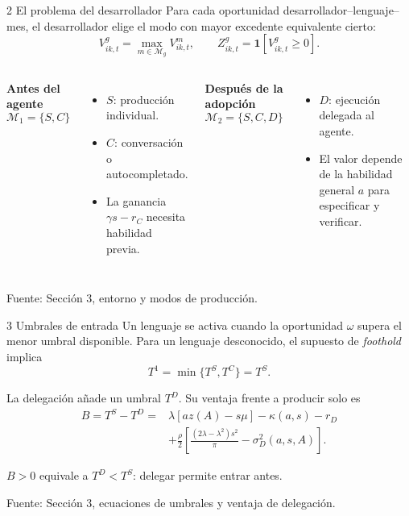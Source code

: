 \documentclass[aspectratio=169,11pt]{beamer}
\newcommand{\sourcefoot}[1]{\vfill{\scriptsize\color{black!60}Fuente: #1}}
\begin{document}
\begin{frame}{2 \textperiodcentered{} El problema del desarrollador}
  Para cada oportunidad desarrollador--lenguaje--mes, el desarrollador elige
  el modo con mayor excedente equivalente cierto:
  \[
    V^g_{ik,t}=\max_{m\in\mathcal M_g}V^m_{ik,t},
    \qquad
    Z^g_{ik,t}=\mathbf 1\!\left[V^g_{ik,t}\ge 0\right].
  \]

  \begin{columns}[T,onlytextwidth]
    \textbf{Antes del agente}
    \[
      \mathcal M_1=\{S,C\}
    \]
    \begin{itemize}\small
      \item $S$: producción individual.
      \item $C$: conversación o autocompletado.
      \item La ganancia $\gamma s-r_C$ necesita habilidad previa.
    \end{itemize}

    \textbf{Después de la adopción}
    \[
      \mathcal M_2=\{S,C,D\}
    \]
    \begin{itemize}\small
      \item $D$: ejecución delegada al agente.
      \item El valor depende de la habilidad general $a$ para especificar y verificar.
    \end{itemize}
  \end{columns}

  \sourcefoot{Sección 3, entorno y modos de producción.}
\end{frame}

\begin{frame}{3 \textperiodcentered{} Umbrales de entrada}
  Un lenguaje se activa cuando la oportunidad $\omega$ supera el menor umbral
  disponible. Para un lenguaje desconocido, el supuesto de \emph{foothold}
  implica
  \[
    T^1=\min\{T^S,T^C\}=T^S.
  \]

  La delegación añade un umbral $T^D$. Su ventaja frente a producir solo es
  \begin{align*}
    B=T^S-T^D
    ={}&\lambda[az(A)-s\mu]-\kappa(a,s)-r_D \\
      &+\frac{\rho}{2}\left[
        \frac{(2\lambda-\lambda^2)s^2}{\pi}
        -\sigma_D^2(a,s,A)
      \right].
  \end{align*}

  \begin{center}
    \alert{$B>0$ equivale a $T^D<T^S$: delegar permite entrar antes.}
  \end{center}

  \sourcefoot{Sección 3, ecuaciones de umbrales y ventaja de delegación.}
\end{frame}
\end{document}
